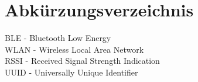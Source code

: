 \chapter*{Abkürzungsverzeichnis}

BLE - Bluetooth Low Energy\\
WLAN - Wireless Local Area Network\\
RSSI - Received Signal Strength Indication\\
UUID - Universally Unique Identifier\\
